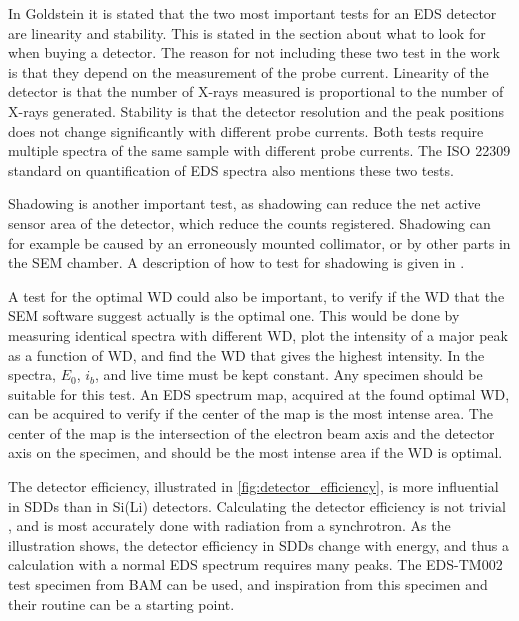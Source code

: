 In Goldstein \cite[p. 232]{goldstein_scanning_2018} it is stated that the two most important tests for an EDS detector are linearity and stability.
This is stated in the section about what to look for when buying a detector.
The reason for not including these two test in the work is that they depend on the measurement of the probe current.
Linearity of the detector is that the number of X-rays measured is proportional to the number of X-rays generated.
Stability is that the detector resolution and the peak positions does not change significantly with different probe currents.
Both tests require multiple spectra of the same sample with different probe currents.
The ISO 22309 standard on quantification of EDS spectra \cite{iso_quantification_22309} also mentions these two tests.

Shadowing is another important test, as shadowing can reduce the net active sensor area of the detector, which reduce the counts registered.
Shadowing can for example be caused by an erroneously mounted collimator, or by other parts in the SEM chamber.
A description of how to test for shadowing is given in \cite{shadowing_procop_2016}.

A test for the optimal WD could also be important, to verify if the WD that the SEM software suggest actually is the optimal one.
This would be done by measuring identical spectra with different WD, plot the intensity of a major peak as a function of WD, and find the WD that gives the highest intensity.
In the spectra, $E_0$, $i_b$, and live time must be kept constant.
Any specimen should be suitable for this test.
An EDS spectrum map, acquired at the found optimal WD, can be acquired to verify if the center of the map is the most intense area.
The center of the map is the intersection of the electron beam axis and the detector axis on the specimen, and should be the most intense area if the WD is optimal.

The detector efficiency, illustrated in \cref{fig:detector_efficiency}, is more influential in SDDs than in Si(Li) detectors.
Calculating the detector efficiency is not trivial \cite{rackwitz_2015_bam}, and is most accurately done with radiation from a synchrotron.
As the illustration shows, the detector efficiency in SDDs change with energy, and thus a calculation with a normal EDS spectrum requires many peaks.
The EDS-TM002 test specimen from BAM \cite{rackwitz_2015_bam} can be used, and inspiration from this specimen and their routine can be a starting point.

